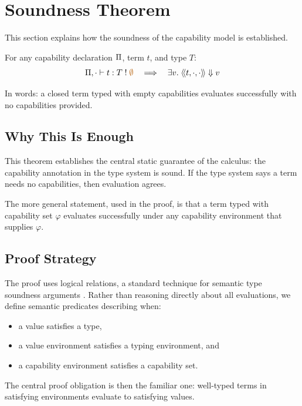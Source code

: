 
\section{Soundness Theorem}
\label{sec:soundness}

This section explains how the soundness of the capability model is established. %

\begin{theorem}[Soundness]
\label{thm:soundness}
For any capability declaration $\Pi$, term $t$, and type $T$:
\[
\typ{\cpdecl}{\cdot}{t}{T}{\effempty}
\quad\Longrightarrow\quad
\exists v.\; \eval{t}{\cdot}{\cpempty}{v}
\]
\end{theorem}

In words: a closed term typed with empty capabilities evaluates successfully
with no capabilities provided. %

\subsection{Why This Is Enough}

This theorem establishes the central static guarantee of the calculus: the
capability annotation in the type system is sound. %
If the type system says a term needs no capabilities, then evaluation agrees. %

The more general statement, used in the proof, is that a term typed with
capability set $\varphi$ evaluates successfully under any capability environment
that supplies $\varphi$. %

\subsection{Proof Strategy}

The proof uses logical relations, a standard technique for semantic type
soundness arguments \cite{pierce-atapl}. %
Rather than reasoning directly about all evaluations, we define semantic
predicates describing when:
\begin{itemize}[nosep]
\item a value satisfies a type,
\item a value environment satisfies a typing environment, and
\item a capability environment satisfies a capability set. %
\end{itemize}

The central proof obligation is then the familiar one: well-typed terms in
satisfying environments evaluate to satisfying values. %

